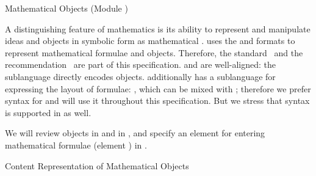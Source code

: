 
\begin{omgroup}[id=mobj,short=Mathematical Objects]
  {Mathematical Objects (Module {})}

  A distinguishing feature of mathematics is its ability to represent and manipulate ideas
  and objects in symbolic form as mathematical .  \omdoc uses
  the \openmath and \mathml formats to represent mathematical formulae and objects.
  Therefore, the {\openmath} standard~\cite{BusCapCar:2oms04} and the 
  recommendation~\cite{CarIon:MathML03} are part of this specification. \openmath and
   are well-aligned: the \cmathml sublanguage directly encodes \openmath
  objects. \mathml additionally has a sublanguage for expressing the layout of formulae:
  \pmathml, which can be mixed with \cmathml; therefore we prefer \mathml syntax for
  \omdoc and will use it throughout this specification. But we stress that \openmath
  syntax is supported in \omdoc as well.

  We will review {\openmath} objects in  and {\cmathml} in ,
  and specify an \omdoc element for entering mathematical formulae (element
  ) in .  

\begin{omgroup}[id=mobj.core]{Content Representation of Mathematical Objects}


\end{omgroup}
\end{omgroup}
